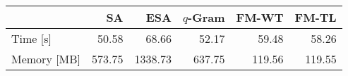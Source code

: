     \begin{tabular}{lrrrrr}
    \toprule
    ~                       & SA 		& ESA 		& $q$-Gram		& FM-WT			&	FM-TL \\
    \midrule
    Time [s] 	            & 50.58		& 68.66		& 52.17			& 59.48			& 58.26      \\
    Memory [MB] 	        & 573.75	& 1338.73	& 637.75		& 119.56		& 119.55      \\
    \bottomrule
    \end{tabular}
